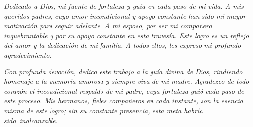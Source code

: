 \thispagestyle{empty}
\null\vfill
\begin{flushright}
  {\large{\textit{Dedicado a Dios, mi fuente de fortaleza y guía en cada paso de mi vida. A mis queridos padres, cuyo amor incondicional y apoyo constante han sido mi mayor motivación para seguir adelante. A mi esposo, por ser mi compañero inquebrantable y por su apoyo constante en esta travesía. Este logro es un reflejo del amor y la dedicación de mi familia. A todos ellos, les expreso mi profundo agradecimiento.\\
  }}}
\end{flushright} %
\newpage 


\thispagestyle{empty}
\null\vfill
\begin{flushright}
  {\large{\textit{Con profunda devoción, dedico este trabajo a la guía divina de Dios, rindiendo homenaje a la memoria amorosa y siempre viva de mi madre.
  Agradezco de todo corazón el incondicional respaldo de mi padre, cuya fortaleza guió cada paso de este proceso. Mis hermanos, fieles compañeros en cada instante, son la esencia misma de este logro; sin su constante presencia, esta meta habría sido inalcanzable.}}}
\end{flushright} %
